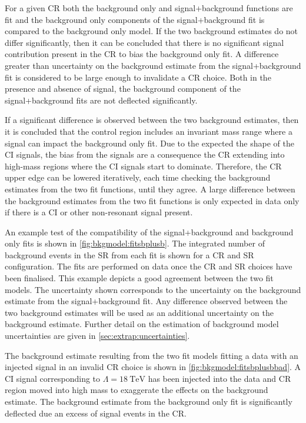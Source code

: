 For a given CR both the background only and signal+background functions are fit and the background only components of the signal+background fit is compared to the background only model. If the two background estimates do not differ significantly, then it can be concluded that there is no significant signal contribution present in the CR to bias the background only fit. A difference greater than uncertainty on the background estimate from the signal+background fit is considered to be large enough to invalidate a CR choice. Both in the presence and absence of signal, the background component of the signal+background fits are not deflected significantly. 

If a significant difference is observed between the two background estimates, then it is concluded that the control region includes an invariant mass range where a signal can impact the background only fit. Due to the expected the shape of the CI signals, the bias from the signals are a consequence the CR extending into high-mass regions where the CI signals start to dominate. Therefore, the CR upper edge can be lowered iteratively, each time checking the background estimates from the two fit functions, until they agree. A large difference between the background estimates from the two fit functions is only expected in data only if there is a CI or other non-resonant signal present. 

An example test of the compatibility of the signal+background and background only fits is shown in \cref{fig:bkgmodel:fitsbplusb}. The integrated number of background events in the SR from each fit is shown for a CR and SR configuration. The fits are performed on data once the CR and SR choices have been finalised. This example depicts a good agreement between the two fit models. The uncertainty shown corresponds to the uncertainty on the background estimate from the signal+background fit. Any difference observed between the two background estimates will be used as an additional uncertainty on the background estimate. Further detail on the estimation of background model uncertainties are given in \cref{sec:extrap:uncertainties}. 

The background estimate resulting from the two fit models fitting a data with an injected signal in an invalid CR choice is shown in \cref{fig:bkgmodel:fitsbplusbbad}. A CI signal corresponding to $\Lambda = \SI{18}{\tera\electronvolt}$ has been injected into the data and CR region moved into high mass to exaggerate the effects on the background estimate. The background estimate from the background only fit is significantly deflected due an excess of signal events in the CR.

